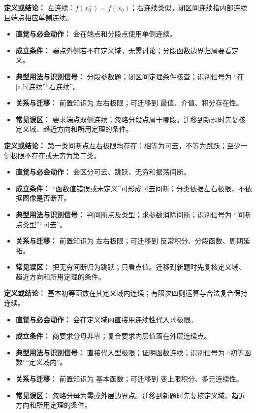 \begin{knowledgeBox}
\textbf{定义或结论：} 左连续：$f(x_0^-)=f(x_0)$；右连续类似。闭区间连续指内部连续且端点相应单侧连续。

\begin{itemize}
  \item \textbf{直觉与必会动作：} 会在端点和分段点使用单侧连续。
  \item \textbf{成立条件：} 端点外侧若不在定义域，无需讨论；分段函数边界归属要看定义。
  \item \textbf{典型用法与识别信号：} 分段参数题；闭区间定理条件核查；识别信号为 “在[a,b]连续”“右连续”。
  \item \textbf{关系与迁移：} 前置知识为 左右极限；可迁移到 最值、介值、积分存在性。
  \item \textbf{常见误区：} 要求端点双侧连续；忽略分段点属于哪段。迁移到新题时先复核定义域、趋近方向和所用定理的条件。
\end{itemize}
\end{knowledgeBox}

\begin{knowledgeBox}
\textbf{定义或结论：} 第一类间断点左右极限均存在：相等为可去，不等为跳跃；至少一侧极限不存在或无穷为第二类。

\begin{itemize}
  \item \textbf{直觉与必会动作：} 会区分可去、跳跃、无穷和振荡间断。
  \item \textbf{成立条件：} “函数值错误或未定义”可形成可去间断；分类依据左右极限，不依据图像是否断开。
  \item \textbf{典型用法与识别信号：} 判间断点及类型；求参数消除间断；识别信号为 “间断点类型”“可去”。
  \item \textbf{关系与迁移：} 前置知识为 左右极限；可迁移到 反常积分、分段函数、周期延拓。
  \item \textbf{常见误区：} 把无穷间断归为跳跃；只看点值。迁移到新题时先复核定义域、趋近方向和所用定理的条件。
\end{itemize}
\end{knowledgeBox}

\begin{knowledgeBox}
\textbf{定义或结论：} 基本初等函数在其定义域内连续；有限次四则运算与合法复合保持连续。

\begin{itemize}
  \item \textbf{直觉与必会动作：} 会在定义域内直接用连续性代入求极限。
  \item \textbf{成立条件：} 商要求分母非零；复合要求内层值落在外层连续点。
  \item \textbf{典型用法与识别信号：} 直接代入型极限；证明函数连续；识别信号为 “初等函数”“定义域内”。
  \item \textbf{关系与迁移：} 前置知识为 基本函数；可迁移到 变上限积分、多元连续性。
  \item \textbf{常见误区：} 忽略分母为零或外层边界点。迁移到新题时先复核定义域、趋近方向和所用定理的条件。
\end{itemize}
\end{knowledgeBox}

